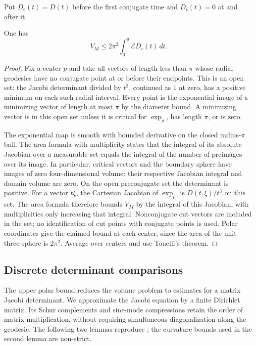 Put $D_c(t)=D(t)$ before the first conjugate time and $D_c(t)=0$ at and
after it.

\begin{lemma}\label{lem:upper-polar}
One has
\[
 V_M\le2\pi^2\int_0^\pi\mathcal E D_c(t)\,dt.
\]
\end{lemma}
\begin{proof}
Fix a center $p$ and take all vectors of length
less than $\pi$ whose radial geodesics have no conjugate point at or
before their endpoints.  This is an open set: the Jacobi determinant
divided by $t^3$, continued as $1$ at zero, has a positive minimum on
each such radial interval.  Every point is the exponential image of a
minimizing vector of length at most $\pi$ by the diameter bound.  A minimizing vector is in this open
set unless it is critical for $\exp_p$, has length $\pi$, or is zero.

The exponential map is smooth with bounded derivative on the closed
radius-$\pi$ ball.  The area formula with multiplicity states that the
integral of its absolute Jacobian over a measurable set equals the
integral of the number of preimages over its image.  In particular,
critical vectors and the boundary sphere have images of zero
four-dimensional volume: their respective Jacobian integral and domain
volume are zero.  On the open preconjugate set the determinant is
positive.  For a vector $t\xi$, the Cartesian Jacobian of $\exp_p$ is
$D(t,\xi)/t^3$ on this set. The area formula therefore bounds $V_M$
by the integral of this Jacobian, with multiplicities only increasing
that integral.
Nonconjugate cut vectors are included in the set; no identification of
cut points with conjugate points is used.  Polar coordinates give the
claimed bound at each center, since the area of the unit
three-sphere is $2\pi^2$.  Average over centers and use Tonelli's theorem.

\end{proof}

\subsection{Discrete determinant comparisons}

The upper polar bound reduces the volume problem to estimates for a
matrix Jacobi determinant. We approximate the Jacobi equation by a finite
Dirichlet matrix. Its Schur complements and sine-mode compressions
retain the order of matrix multiplication, without requiring
simultaneous diagonalization along the geodesic. The following two
lemmas reproduce \cite[Lemmas~4.5--4.6]{OpenAI2026P}; the curvature
bounds used in the second lemma are non-strict.

